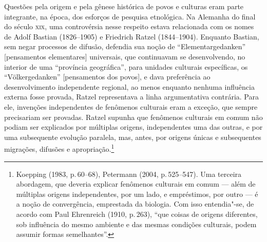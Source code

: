 Questões pela origem e pela gênese histórica de povos e culturas eram
parte integrante, na época, dos esforços de pesquisa etnológica. Na
Alemanha do final do século \textsc{xix}, uma controvérsia nesse respeito estava
relacionada com os nomes de Adolf Bastian (1826--1905) e Friedrich Ratzel
(1844--1904). Enquanto Bastian, sem negar processos de difusão, defendia
sua noção de ``Elementargedanken'' {[}pensamentos elementares{]}
universais, que continuavam se desenvolvendo, no interior de uma
``província geográfica'', para unidades culturais específicas, os
``Völkergedanken'' {[}pensamentos dos povos{]}, e dava preferência ao
desenvolvimento independente regional, ao menos enquanto nenhuma
influência externa fosse provada, Ratzel representava a linha
argumentativa contrária. Para ele, invenções independentes de fenômenos
culturais eram a exceção, que sempre precisariam ser provadas. Ratzel
supunha que fenômenos culturais em comum não podiam ser explicados por
múltiplas origens, independentes uma das outras, e por uma subsequente
evolução paralela, mas, antes, por origens únicas e subsequentes
migrações, difusões e apropriação.\footnote{Koepping (1983, p.\,60--68),
  Petermann (2004, p.\,525--547). Uma terceira abordagem, que deveria
  explicar fenômenos culturais em comum --- além de múltiplas origens
  independentes, por um lado, e empréstimos, por outro --- é a noção de
  convergência, emprestada da biologia. Com isso entendia"-se, de acordo
  com Paul Ehrenreich (1910, p.\,263), ``que coisas de origens
  diferentes, sob influência do mesmo ambiente e das mesmas condições
  culturais, podem assumir formas semelhantes''.}

